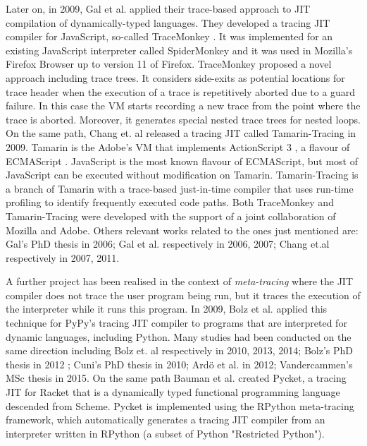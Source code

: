 Later on, in 2009, Gal et al. applied their trace-based approach to JIT compilation of dynamically-typed languages. They developed a tracing JIT compiler for JavaScript, so-called TraceMonkey \cite{gal2009trace}. It was implemented for an existing JavaScript interpreter called SpiderMonkey \cite{spidermonkey} and it was used in Mozilla's Firefox Browser up to version 11 of Firefox. TraceMonkey proposed a novel approach including trace trees. It considers side-exits as potential locations for trace header when the execution of a trace is repetitively aborted due to a guard failure. In this case the VM starts recording a new trace from the point where the trace is aborted. Moreover, it generates special nested trace trees for nested loops. On the same path, Chang et. al \cite{chang2009tracing} released a tracing JIT called Tamarin-Tracing in 2009. Tamarin is the Adobe's VM that implements ActionScript 3 \cite{adobeactionscript3}, a flavour of ECMAScript \cite{ecmascript}. JavaScript is the most known flavour of ECMAScript, but most of JavaScript can be executed without modification on Tamarin. Tamarin-Tracing is a branch of Tamarin with a trace-based just-in-time compiler that uses run-time profiling to identify frequently executed code paths. Both TraceMonkey and Tamarin-Tracing were developed with the support of a joint collaboration of Mozilla and Adobe. Others relevant works related to the ones just mentioned are: Gal's PhD thesis \cite{gal2006efficient} in 2006; Gal et al. \cite{gal2006incremental, gal2007making} respectively in 2006, 2007; Chang et.al \cite{chang2007efficient, chang2012impact} respectively in 2007, 2011.

A further project has been realised in the context of \textit{meta-tracing} where the JIT compiler does not trace the user program being run, but it traces the execution of the interpreter while it runs this program. In 2009, Bolz et al. \cite{bolz2009tracing} applied this technique for PyPy's tracing JIT compiler to programs that are interpreted for dynamic languages, including Python. Many studies had been conducted on the same direction including  Bolz et. al \cite{bolz2010allocation, bolz2013impact, bolz2014meta} respectively in 2010, 2013, 2014;  Bolz's PhD thesis \cite{bolz2012meta} in 2012 ; Cuni's PhD thesis \cite{cuni2010high} in 2010; Ard{\"o} et al. \cite{ardo2012loop} in 2012; Vandercammen's MSc thesis \cite{vandercammen2015essence} in 2015. On the same path Bauman et al. \cite{bauman2015pycket} created Pycket, a tracing JIT for Racket that is a dynamically typed functional programming language descended from Scheme. Pycket is implemented using the RPython meta-tracing framework, which automatically generates a tracing JIT compiler from an interpreter written in RPython (a subset of Python "Restricted Python").

